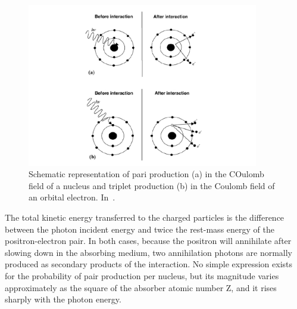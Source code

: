 \begin{figure}[!htbp]
\centering
\includegraphics[width=0.9\textwidth]{03_GraphicFiles/chapter2_GammaCameras/pairProd.pdf}
\caption{Schematic representation of pari production (a) in the COulomb field of a nucleus and triplet production (b) in the Coulomb field of an orbital electron. In~\cite{Podgirsak2010}.}
\label{chap2::fig::pairprod}
\end{figure} 

The total kinetic energy transferred to the charged particles is the difference between the photon incident energy and twice the rest-mass energy of the positron-electron pair.
In both cases, because the positron will annihilate after slowing down in the absorbing medium, two annihilation photons are normally produced as secondary products of the interaction. 
No simple expression exists for the probability of pair production per nucleus, but its magnitude varies approximately as the square of the absorber atomic number Z, and it rises sharply with the photon energy. 

